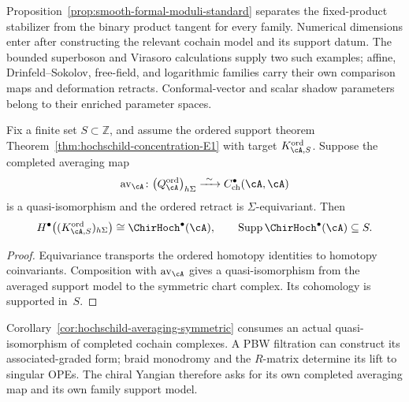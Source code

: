 \begin{remark}
\label{rem:smooth-formal-moduli-archetype}
Proposition~\ref{prop:smooth-formal-moduli-standard} separates the
fixed-product stabilizer from the binary product tangent for every
family.  Numerical dimensions enter after constructing the relevant
cochain model and its support datum.  The bounded superboson and
Virasoro calculations supply two such examples; affine,
Drinfeld--Sokolov, free-field, and logarithmic families carry their own
comparison maps and deformation retracts.  Conformal-vector and scalar
shadow parameters belong to their enriched parameter spaces.
\end{remark}

\begin{corollary}
\label{cor:hochschild-averaging-symmetric}
Fix a finite set \(S\subset\mathbb Z\), and assume the ordered
support theorem
Theorem~\ref{thm:hochschild-concentration-E1} with target
\(K^{\mathrm{ord}}_{\cA,S}\).  Suppose the completed averaging map
\[
 \operatorname{av}_\cA\colon
 \bigl(Q^{\mathrm{ord}}_\cA\bigr)_{h\Sigma}
 \xrightarrow{\ \sim\ }C^\bullet_{\mathrm{ch}}(\cA,\cA)
\]
is a quasi-isomorphism and the ordered retract is
\(\Sigma\)-equivariant.  Then
\[
 H^\bullet\!\left(
 (K^{\mathrm{ord}}_{\cA,S})_{h\Sigma}
 \right)
 \cong\ChirHoch^\bullet(\cA),
 \qquad
 \operatorname{Supp}\ChirHoch^\bullet(\cA)\subseteq S.
\]
\end{corollary}

\begin{proof}
Equivariance transports the ordered homotopy identities to homotopy
coinvariants.  Composition with \(\operatorname{av}_\cA\) gives a
quasi-isomorphism from the averaged support model to the symmetric
chart complex.  Its cohomology is supported in~\(S\).
\end{proof}

\begin{remark}
\label{rem:hochschild-averaging-scope}
Corollary~\textup{\ref{cor:hochschild-averaging-symmetric}} consumes
an actual quasi-isomorphism of completed cochain complexes.  A PBW
filtration can construct its associated-graded form; braid monodromy
and the \(R\)-matrix determine its lift to singular OPEs.  The chiral
Yangian therefore asks for its own completed averaging map and its own
family support model.
\end{remark}

